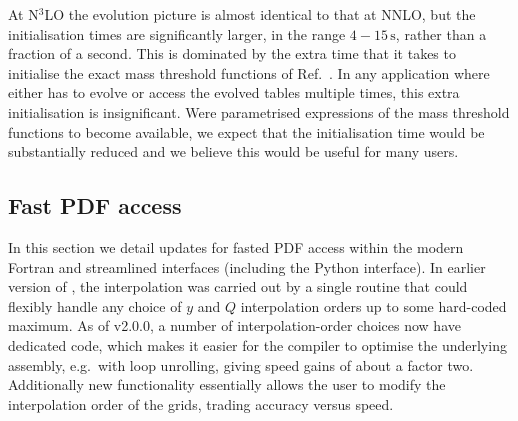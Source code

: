 At N$^3$LO the evolution picture is almost identical to that at NNLO,
but the initialisation times are significantly larger, in the range
$4-15\, \mathrm{s}$, rather than a fraction of a second.
%
This is dominated by the extra time that it takes
to initialise the exact mass threshold functions of
Ref.~\cite{BlumleinCode}.
%
In any application where \hoppet{} either
has to evolve or access the evolved tables multiple times, this extra
initialisation is insignificant.
%
Were parametrised expressions of the mass threshold functions to
become available, we expect that the initialisation time would be
substantially reduced and we believe this would be useful for many
users.


\subsection{Fast PDF access}
\label{sec:fastpdf}

In this section we detail updates for fasted PDF access within the
modern Fortran and streamlined interfaces (including the Python interface).
% 
%
In earlier version of \hoppet, the interpolation was carried out by a
single routine that could flexibly handle any choice of $y$ and $Q$
interpolation orders up to some hard-coded maximum.
%
As of v2.0.0, a number of interpolation-order choices now have
dedicated code, which makes it easier for the compiler to optimise the
underlying assembly, e.g.\ with loop unrolling, giving speed gains of
about a factor two.
%
% 
Additionally new functionality essentially allows the user to modify
the interpolation order of the \hoppet{} grids, trading accuracy
versus speed.




